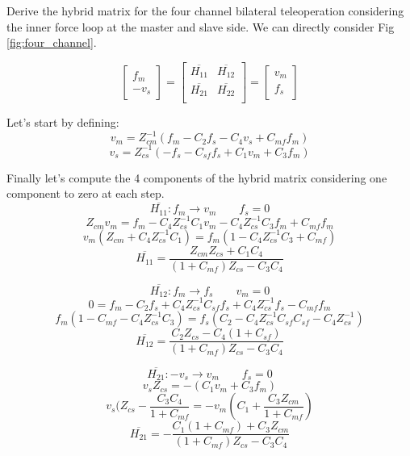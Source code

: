 \documentclass[a4paper,12pt]{article}
\begin{document}
Derive the hybrid matrix for the four channel bilateral teleoperation considering the inner force loop at the master and slave side. We can directly consider Fig \ref{fig:four_channel}.

\[
\begin{bmatrix}  f_m \\ -v_s \end{bmatrix} = \begin{bmatrix}
    \overline{H_{11}} & \overline{H_{12}} \\
    \overline{H_{21}} &  \overline{H_{22}} \\
\end{bmatrix} = \begin{bmatrix}  v_m \\ f_s \end{bmatrix}
\]

\noindent Let's start by defining:
\begin{equation}
    v_m = Z_{cm}^{-1}(f_m -C_2f_s-C_4v_s+C_{mf}f_m)
\end{equation}
\begin{equation}
    v_s = Z_{cs}^{-1}(-f_s -C_{sf}f_s+C_1v_m+C_3f_m)
\end{equation}

\noindent Finally let's compute the 4 components of the hybrid matrix considering one component to zero at each step.
\[
    \overline{H_{11}} : f_m \rightarrow v_m \qquad f_s = 0
    \]\[
    Z_{cm}v_m = f_m - C_4Z_{cs}^{-1}C_1v_m - C_4Z_{cs}^{-1}C_3f_m + C_{mf}f_m
\]\[
    v_m(Z_{cm}+C_4Z_{cs}^{-1}C_1) = f_m(1-C_4Z_{cs}^{-1}C_3 + C_{mf})
    \]\[
    \overline{H_{11}} = \frac{Z_{cm}Z_{cs}+C_1C_4}{(1+C_{mf})Z_{cs} - C_3C_4}
\]


\bigskip

\[
    \overline{H_{12}} : f_m \rightarrow f_s \qquad v_m = 0
    \]\[
    0 = f_m -C_2f_s +C_4Z_{cs}^{-1}C_{sf}f_s + C_4Z_{cs}^{-1}f_s - C_{mf}f_m
\]\[
    f_m(1-C_{mf}-C_4Z_{cs}^{-1}C_3) = f_s(C_2-C_4Z_{cs}^{-1}C_{sf}C_{sf}-C_4Z_{cs}^{-1})
    \]\[
    \overline{H_{12}} = \frac{C_2Z_{cs}-C_4(1+C_{sf})}{(1+C_{mf})Z_{cs} - C_3C_4}
\]

\bigskip

\[
    \overline{H_{21}} : -v_s \rightarrow v_m \qquad f_s = 0
    \]\[
    v_sZ_{cs} = -(C_1v_m + C_3f_m)
\]\[
    v_s(Z_{cs} - \frac{C_3C_4}{1+C_{mf}} = -v_m(C_1 + \frac{C_3Z_{cm}}{1+C_{mf}})
    \]\[
    \overline{H_{21}} = -\frac{C_1(1+C_{mf}) + C_3Z_{cm}}{(1+C_{mf})Z_{cs} - C_3C_4}
\]


\bigskip
\end{document}

